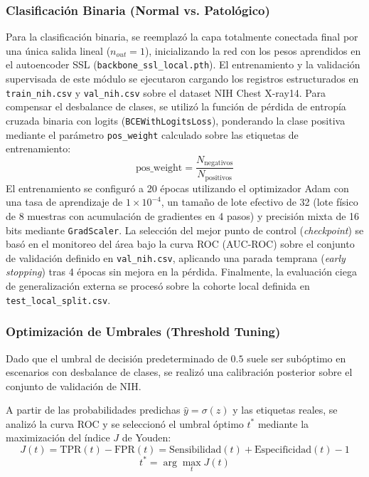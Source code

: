 \documentclass[../main.tex]{subfiles}
\begin{document}
\subsubsection{Clasificación Binaria (Normal vs. Patológico)}
Para la clasificación binaria, se reemplazó la capa totalmente conectada final por una única salida lineal ($n_{out}=1$), inicializando la red con los pesos aprendidos en el autoencoder SSL (\texttt{backbone\_ssl\_local.pth}). El entrenamiento y la validación supervisada de este módulo se ejecutaron cargando los registros estructurados en \texttt{train\_nih.csv} y \texttt{val\_nih.csv} sobre el dataset NIH Chest X-ray14. Para compensar el desbalance de clases, se utilizó la función de pérdida de entropía cruzada binaria con logits (\texttt{BCEWithLogitsLoss}), ponderando la clase positiva mediante el parámetro \texttt{pos\_weight} calculado sobre las etiquetas de entrenamiento:
\begin{equation}
\text{pos\_weight} = \frac{N_{\text{negativos}}}{N_{\text{positivos}}}
\end{equation}
El entrenamiento se configuró a 20 épocas utilizando el optimizador Adam con una tasa de aprendizaje de $1\times10^{-4}$, un tamaño de lote efectivo de 32 (lote físico de 8 muestras con acumulación de gradientes en 4 pasos) y precisión mixta de 16 bits mediante \texttt{GradScaler}. La selección del mejor punto de control (\textit{checkpoint}) se basó en el monitoreo del área bajo la curva ROC (AUC-ROC) sobre el conjunto de validación definido en \texttt{val\_nih.csv}, aplicando una parada temprana (\textit{early stopping}) tras 4 épocas sin mejora en la pérdida. Finalmente, la evaluación ciega de generalización externa se procesó sobre la cohorte local definida en \texttt{test\_local\_split.csv}.

\subsubsection{Optimización de Umbrales (Threshold Tuning)}
Dado que el umbral de decisión predeterminado de $0.5$ suele ser subóptimo en escenarios con desbalance de clases, se realizó una calibración posterior sobre el conjunto de validación de NIH. 

A partir de las probabilidades predichas $\hat{y} = \sigma(z)$ y las etiquetas reales, se analizó la curva ROC y se seleccionó el umbral óptimo $t^*$ mediante la maximización del índice $J$ de Youden:
\begin{equation}
    J(t) = \text{TPR}(t) - \text{FPR}(t) = \text{Sensibilidad}(t) + \text{Especificidad}(t) - 1
\end{equation}
\begin{equation}
    t^* = \arg\max_{t} J(t)
\end{equation}
\end{document}

